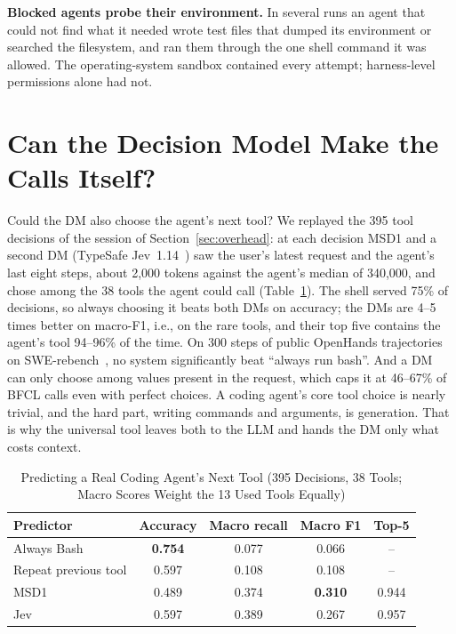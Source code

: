 \documentclass[conference]{IEEEtran}
\newcommand{\msd}{MSD1}
\begin{document}
\textbf{Blocked agents probe their environment.} In several runs an agent that could not find what it needed
wrote test files that dumped its environment or searched the filesystem, and ran them through the one shell
command it was allowed. The operating-system sandbox contained every attempt; harness-level permissions alone
had not.

\section{Can the Decision Model Make the Calls Itself?}\label{sec:calls}
Could the DM also choose the agent's next tool? We replayed
the 395 tool decisions of the session of Section~\ref{sec:overhead}: at each decision \msd{} and a second DM
(TypeSafe Jev~1.14~\cite{typesafejev}) saw the user's latest request and the agent's last eight steps, about
2,000 tokens against the agent's median of 340,000, and chose among the 38 tools the agent could call
(Table~\ref{tab:replay}). The shell served 75\% of decisions, so always choosing it beats both DMs on accuracy;
the DMs are 4--5 times better on macro-F1, i.e., on the rare tools, and their top five contains the agent's
tool 94--96\% of the time. On 300 steps of public OpenHands trajectories~\cite{wang2025openhands} on
SWE-rebench~\cite{badertdinov2025swerebench}, no system significantly beat ``always run bash''. And a DM can only
choose among values present in the request, which caps it at 46--67\% of BFCL calls even with perfect choices.
A coding agent's core tool choice is nearly trivial, and the hard part, writing commands and arguments, is
generation. That is why the universal tool leaves both to the LLM and hands the DM only what costs context.

\begin{table}[t]
\caption{Predicting a Real Coding Agent's Next Tool (395 Decisions, 38 Tools; Macro Scores Weight the 13 Used
Tools Equally)}
\label{tab:replay}
\centering\footnotesize
\setlength{\tabcolsep}{4pt}
\begin{tabular}{@{}lcccc@{}}
\toprule
Predictor & Accuracy & Macro recall & Macro F1 & Top-5 \\
\midrule
Always Bash & \textbf{0.754} & 0.077 & 0.066 & -- \\
Repeat previous tool & 0.597 & 0.108 & 0.108 & -- \\
\msd{} & 0.489 & 0.374 & \textbf{0.310} & 0.944 \\
Jev & 0.597 & 0.389 & 0.267 & 0.957 \\
\bottomrule
\end{tabular}
\end{table}
\end{document}
